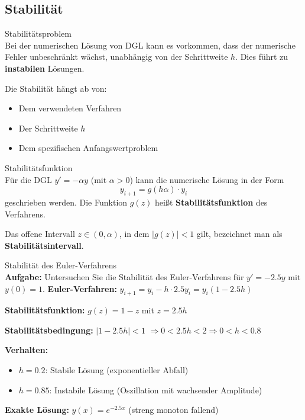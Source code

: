 \raggedcolumns
\columnbreak

\subsection{Stabilität}

\begin{concept}{Stabilitätsproblem}\\
Bei der numerischen Lösung von DGL kann es vorkommen, dass der numerische Fehler unbeschränkt wächst, unabhängig von der Schrittweite $h$. Dies führt zu \textbf{instabilen} Lösungen.

Die Stabilität hängt ab von:
\begin{itemize}
    \item Dem verwendeten Verfahren
    \item Der Schrittweite $h$
    \item Dem spezifischen Anfangswertproblem
\end{itemize}
\end{concept}

\begin{definition}{Stabilitätsfunktion}\\
Für die DGL $y' = -\alpha y$ (mit $\alpha > 0$) kann die numerische Lösung in der Form
$$y_{i+1} = g(h\alpha) \cdot y_i$$
geschrieben werden. Die Funktion $g(z)$ heißt \textbf{Stabilitätsfunktion} des Verfahrens.

Das offene Intervall $z \in (0, \alpha)$, in dem $|g(z)| < 1$ gilt, bezeichnet man als \textbf{Stabilitätsintervall}.
\end{definition}

\begin{example2}{Stabilität des Euler-Verfahrens}\\
\textbf{Aufgabe:} Untersuchen Sie die Stabilität des Euler-Verfahrens für $y' = -2.5y$ mit $y(0) = 1$.
\tcblower
\textbf{Euler-Verfahren:} $y_{i+1} = y_i - h \cdot 2.5 y_i = y_i(1 - 2.5h)$

\textbf{Stabilitätsfunktion:} $g(z) = 1 - z$ mit $z = 2.5h$

\textbf{Stabilitätsbedingung:} $|1 - 2.5h| < 1$
$\Rightarrow 0 < 2.5h < 2 \Rightarrow 0 < h < 0.8$

\textbf{Verhalten:}
\begin{itemize}
    \item $h = 0.2$: Stabile Lösung (exponentieller Abfall)
    \item $h = 0.85$: Instabile Lösung (Oszillation mit wachsender Amplitude)
\end{itemize}

\textbf{Exakte Lösung:} $y(x) = e^{-2.5x}$ (streng monoton fallend)
\end{example2}


